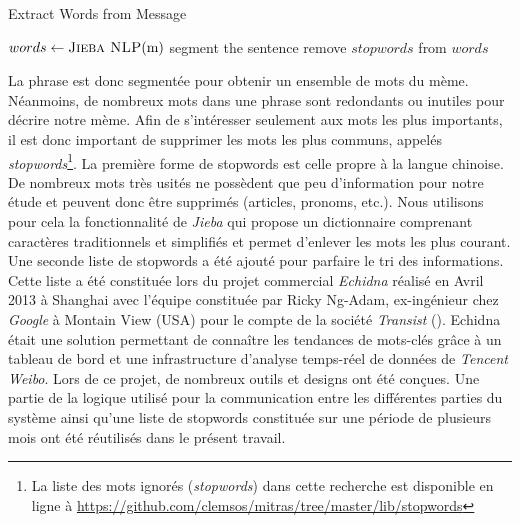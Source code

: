     \begin{algorithm}[htpb]
        \caption{Extract Words from Message}
        \label{algo:message-graph}
        \begin{algorithmic}

                \State $words \gets \Call{Jieba NLP}{$m$}$ segment the sentence
                \State remove $stopwords$ from $words$                

        \end{algorithmic}
    \end{algorithm}

    La phrase est donc segmentée  pour obtenir un ensemble de mots du mème. Néanmoins, de nombreux mots dans une phrase sont redondants ou inutiles pour décrire notre mème. Afin de s'intéresser seulement aux mots les plus importants, il est donc important de  supprimer les mots les plus communs, appelés \textit{stopwords}\footnote{La liste des mots ignorés (\textit{stopwords}) dans cette recherche est disponible en ligne à \url{https://github.com/clemsos/mitras/tree/master/lib/stopwords}}. La première forme de stopwords est celle propre à la langue chinoise. De nombreux mots très usités ne possèdent que peu d'information pour notre étude et peuvent donc être supprimés (articles, pronoms, etc.). Nous utilisons pour cela la fonctionnalité de \textit{Jieba} qui propose un dictionnaire comprenant caractères traditionnels et simplifiés et permet d'enlever les mots les plus courant. Une seconde liste de stopwords a été ajouté pour parfaire le tri des informations. Cette liste a été constituée lors du projet commercial \textit{Echidna} réalisé en Avril 2013 à Shanghai avec l'équipe constituée par Ricky Ng-Adam, ex-ingénieur chez \textit{Google} à Montain View (USA) pour le compte de la société \textit{Transist} (). Echidna était une solution permettant de connaître les tendances de mots-clés grâce à un tableau de bord et une infrastructure d'analyse temps-réel de données de \textit{Tencent Weibo}. Lors de ce projet, de nombreux outils et designs ont été conçues. Une partie de la logique utilisé pour la communication entre les différentes parties du système ainsi qu'une liste de stopwords constituée sur une période de plusieurs mois ont été réutilisés dans le présent travail.
    
